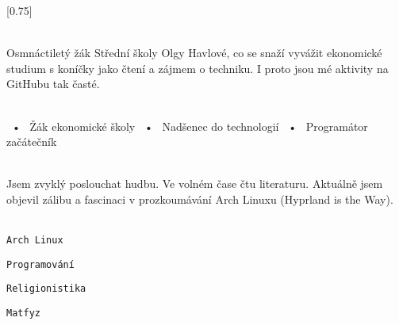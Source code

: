 \documentclass[verylight]{simplehipstercv}
\begin{document}
\setlength{\columnsep}{1.5cm}
[0.75]
\begin{paracol}{2}

\paracolbackgroundoptions



\footnotesize
{\setasidefontcolour
\flushright
{} %

\\[0.5em]

{\footnotesize
Osmnáctiletý žák Střední školy Olgy Havlové, co se snaží vyvážit ekonomické studium s koníčky jako čtení a zájmem o techniku. I proto jsou mé aktivity na GitHubu tak časté.} \\
\bigskip

 \\[0.5em]

~•~ Žák ekonomické školy ~•~ Nadšenec do technologií ~•~ Programátor začátečník

\bigskip



\bigskip

\\[0.5em]

Jsem zvyklý poslouchat hudbu.
Ve volném čase čtu literaturu.
Aktuálně jsem objevil zálibu a fascinaci v prozkoumávání Arch Linuxu (Hyprland is the Way). \\
\bigskip

\\[0.5em]

\texttt{Arch Linux}

\texttt{Programování}

\texttt{Religionistika}

\texttt{Matfyz}

\vspace{4em}

 \\
\vspace{14em}

}
\end{paracol}
\end{document}
